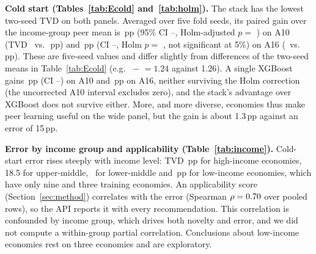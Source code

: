 \textbf{Cold start (Tables~\ref{tab:Ecold} and~\ref{tab:holm}).} The stack has the lowest two-seed TVD on both panels. Averaged over five fold seeds, its paired gain over the income-group peer mean is \FSStackTenGain\,pp (95\% CI \FSStackTenLo--\FSStackTenHi, Holm-adjusted $p=$ \FSStackTenHolm) on A10 (TVD \FSTVDStackTen\ vs.\ \FSTVDPeerTen\,pp) and \FSStackSixteenGain\,pp (CI \FSStackSixteenLo--\FSStackSixteenHi, Holm $p=$ \FSStackSixteenHolm, not significant at 5\%) on A16 (\FSTVDStackSixteen\ vs.\ \FSTVDPeerSixteen\,pp). These are five-seed values and differ slightly from differences of the two-seed means in Table~\ref{tab:Ecold} (e.g.\ \ColdPeerTen{} $-$ \ColdStackTen{} $=1.24$ against 1.26). A single XGBoost gains \FSXgbTenGain\,pp (CI \FSXgbTenLo--\FSXgbTenHi) on A10 and \FSXgbSixteenGain\,pp on A16, neither surviving the Holm correction (the uncorrected A10 interval excludes zero), and the stack's advantage over XGBoost does not survive either. More, and more diverse, economies thus make peer learning useful on the wide panel, but the gain is about 1.3\,pp against an error of 15\,pp.




\textbf{Error by income group and applicability (Table~\ref{tab:income}).} Cold-start error rises steeply with income level: TVD \ErrHigh\,pp for high-income economies, 18.5 for upper-middle, \ErrLowerMid\ for lower-middle and \ErrLow\,pp for low-income economies, which have only nine and three training economies. An applicability score (Section~\ref{sec:method}) correlates with the error (Spearman $\rho=0.70$ over pooled rows), so the API reports it with every recommendation. This correlation is confounded by income group, which drives both novelty and error, and we did not compute a within-group partial correlation. Conclusions about low-income economies rest on three economies and are exploratory.



